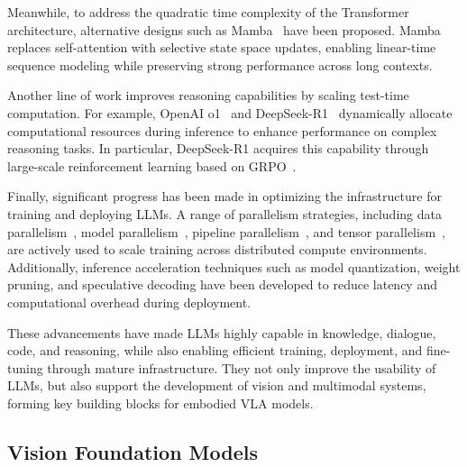 \documentclass[10pt, a4paper, logo, copyright]{googledeepmind} %
\begin{document}
Meanwhile, to address the quadratic time complexity of the Transformer architecture, alternative designs such as Mamba~\cite{gumamba} have been proposed. Mamba replaces self-attention with selective state space updates, enabling linear-time sequence modeling while preserving strong performance across long contexts.

Another line of work improves reasoning capabilities by scaling test-time computation. For example, OpenAI o1~\cite{jaech2024openai} and DeepSeek-R1~\cite{guo2025deepseek} dynamically allocate computational resources during inference to enhance performance on complex reasoning tasks. In particular, DeepSeek-R1 acquires this capability through large-scale reinforcement learning based on GRPO~\cite{shao2024deepseekmath}. 


Finally, significant progress has been made in optimizing the infrastructure for training and deploying LLMs. A range of parallelism strategies, including data parallelism~\cite{LiAPSAJLSS14}, model parallelism~\cite{dean2012large}, pipeline parallelism~\cite{narayanan2019pipedream}, and tensor parallelism~\cite{shoeybi2019megatron}, are actively used to scale training across distributed compute environments. Additionally, inference acceleration techniques such as model quantization, weight pruning, and speculative decoding have been developed to reduce latency and computational overhead during deployment.

These advancements have made LLMs highly capable in knowledge, dialogue, code, and reasoning, while also enabling efficient training, deployment, and fine-tuning through mature infrastructure. They not only improve the usability of LLMs, but also support the development of vision and multimodal systems, forming key building blocks for embodied VLA models.


\subsection{Vision Foundation Models}
\label{sec:vfms}
\end{document}

